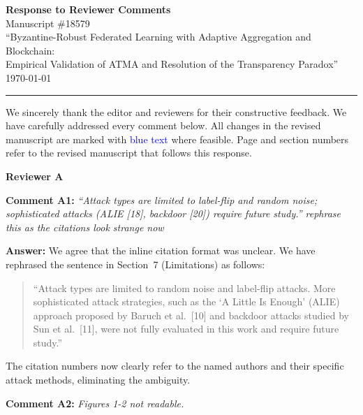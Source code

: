 \documentclass[12pt,a4paper,onecolumn]{article}
\begin{document}

\begin{center}
{\Large\textbf{Response to Reviewer Comments}}\\[10pt]
Manuscript \#18579\\
``Byzantine-Robust Federated Learning with Adaptive Aggregation and Blockchain:\\
Empirical Validation of ATMA and Resolution of the Transparency Paradox''\\[10pt]
\today
\end{center}

\noindent\rule{\textwidth}{0.4pt}

We sincerely thank the editor and reviewers for their constructive feedback. We have carefully addressed every comment below. All changes in the revised manuscript are marked with \textcolor{blue}{blue text} where feasible. Page and section numbers refer to the revised manuscript that follows this response.

\bigskip

\noindent\textbf{\large Reviewer A}

\bigskip

\noindent\textbf{Comment A1:} \textit{``Attack types are limited to label-flip and random noise; sophisticated attacks (ALIE [18], backdoor [20]) require future study.'' rephrase this as the citations look strange now}

\noindent\textbf{Answer:} We agree that the inline citation format was unclear. We have rephrased the sentence in Section~7 (Limitations) as follows:

\begin{quote}
``Attack types are limited to random noise and label-flip attacks. More sophisticated attack strategies, such as the `A Little Is Enough' (ALIE) approach proposed by Baruch et al.~[10] and backdoor attacks studied by Sun et al.~[11], were not fully evaluated in this work and require future study.''
\end{quote}

The citation numbers now clearly refer to the named authors and their specific attack methods, eliminating the ambiguity.

\bigskip

\noindent\textbf{Comment A2:} \textit{Figures 1-2 not readable.}
\end{document}
